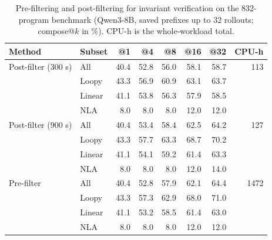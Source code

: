 \begin{table}[t]
\centering
\small
\caption{Pre-filtering and post-filtering for invariant verification on the
  832-program benchmark (Qwen3-8B, saved prefixes up to 32 rollouts; compose@\(k\)
  in \%).  CPU-h is the whole-workload total.}
\label{tab:prefilt-vs-postfilt}
\begin{tabular}{ll rrrrr r}
\toprule
\rowcolor{algobg}
Method & Subset & @1 & @4 & @8 & @16 & @32 & CPU-h \\
\midrule
Post-filter (300 s)  & All    & 40.4 & 52.8 & 56.0 & 58.1 & 58.7 &  113 \\
                    & Loopy  & 43.3 & 56.9 & 60.9 & 63.1 & 63.7 &      \\
                    & Linear & 41.1 & 53.8 & 56.3 & 57.9 & 58.5 &      \\
                    & NLA    &  8.0 &  8.0 &  8.0 & 12.0 & 12.0 &      \\
\midrule
Post-filter (900 s)  & All    & 40.4 & 53.4 & 58.4 & 62.5 & 64.2 &  127 \\
                    & Loopy  & 43.3 & 57.7 & 63.3 & 68.7 & 70.2 &      \\
                    & Linear & 41.1 & 54.1 & 59.2 & 61.4 & 63.3 &      \\
                    & NLA    &  8.0 &  8.0 &  8.0 & 12.0 & 14.0 &      \\
\midrule
Pre-filter          & All    & 40.4 & 52.8 & 57.9 & 62.1 & 64.4 & 1472 \\
                    & Loopy  & 43.3 & 57.3 & 62.9 & 68.0 & 71.0 &      \\
                    & Linear & 41.1 & 53.2 & 58.5 & 61.4 & 63.0 &      \\
                    & NLA    &  8.0 &  8.0 &  8.0 & 12.0 & 12.0 &      \\
\bottomrule
\end{tabular}
\end{table}
